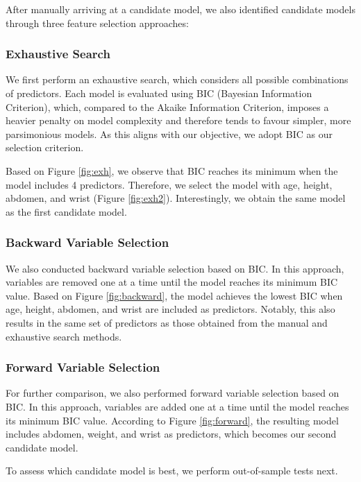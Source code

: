 \documentclass[letterpaper,9pt,twocolumn,twoside,]{pinp}
\begin{document}
After manually arriving at a candidate model, we also identified
candidate models through three feature selection approaches:

\subsubsection{Exhaustive Search}\label{exhaustive-search}

We first perform an exhaustive search, which considers all possible
combinations of predictors. Each model is evaluated using BIC (Bayesian
Information Criterion), which, compared to the Akaike Information
Criterion, imposes a heavier penalty on model complexity and therefore
tends to favour simpler, more parsimonious models. As this aligns with
our objective, we adopt BIC as our selection criterion.

Based on Figure \ref{fig:exh}, we observe that BIC reaches its minimum
when the model includes 4 predictors. Therefore, we select the model
with age, height, abdomen, and wrist (Figure \ref{fig:exh2}).
Interestingly, we obtain the same model as the first candidate model.

\subsubsection{Backward Variable
Selection}\label{backward-variable-selection}

We also conducted backward variable selection based on BIC. In this
approach, variables are removed one at a time until the model reaches
its minimum BIC value. Based on Figure \ref{fig:backward}, the model
achieves the lowest BIC when age, height, abdomen, and wrist are
included as predictors. Notably, this also results in the same set of
predictors as those obtained from the manual and exhaustive search
methods.

\subsubsection{Forward Variable
Selection}\label{forward-variable-selection}

For further comparison, we also performed forward variable selection
based on BIC. In this approach, variables are added one at a time until
the model reaches its minimum BIC value. According to Figure
\ref{fig:forward}, the resulting model includes abdomen, weight, and
wrist as predictors, which becomes our second candidate model.

To assess which candidate model is best, we perform out-of-sample tests
next.
\end{document}
